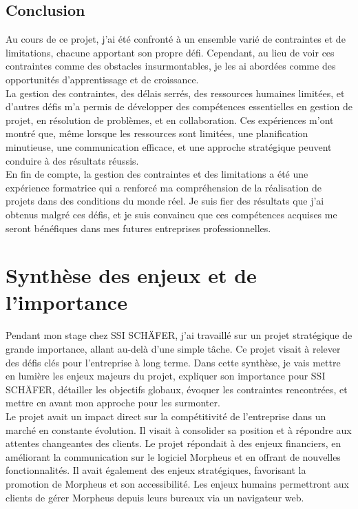 \documentclass[a4paper, 12pt, french]{article}
\begin{document}
					\subsection{Conclusion}
							Au cours de ce projet, j'ai été confronté à un ensemble varié de contraintes et de limitations, chacune apportant son propre défi. Cependant, au lieu de voir ces contraintes comme des obstacles insurmontables, je les ai abordées comme des opportunités d'apprentissage et de croissance.\\

							La gestion des contraintes, des délais serrés, des ressources humaines limitées, et d'autres défis m'a permis de développer des compétences essentielles en gestion de projet, en résolution de problèmes, et en collaboration. Ces expériences m'ont montré que, même lorsque les ressources sont limitées, une planification minutieuse, une communication efficace, et une approche stratégique peuvent conduire à des résultats réussis.\\

							En fin de compte, la gestion des contraintes et des limitations a été une expérience formatrice qui a renforcé ma compréhension de la réalisation de projets dans des conditions du monde réel. Je suis fier des résultats que j'ai obtenus malgré ces défis, et je suis convaincu que ces compétences acquises me seront bénéfiques dans mes futures entreprises professionnelles.

			\section{Synthèse des enjeux et de l'importance}
				Pendant mon stage chez SSI SCHÄFER, j'ai travaillé sur un projet stratégique de grande importance, allant au-delà d'une simple tâche. Ce projet visait à relever des défis clés pour l'entreprise à long terme. Dans cette synthèse, je vais mettre en lumière les enjeux majeurs du projet, expliquer son importance pour SSI SCHÄFER, détailler les objectifs globaux, évoquer les contraintes rencontrées, et mettre en avant mon approche pour les surmonter.\\

				Le projet avait un impact direct sur la compétitivité de l'entreprise dans un marché en constante évolution. Il visait à consolider sa position et à répondre aux attentes changeantes des clients. Le projet répondait à des enjeux financiers, en améliorant la communication sur le logiciel Morpheus et en offrant de nouvelles fonctionnalités. Il avait également des enjeux stratégiques, favorisant la promotion de Morpheus et son accessibilité. Les enjeux humains permettront aux clients de gérer Morpheus depuis leurs bureaux via un navigateur web.\\
\end{document}
